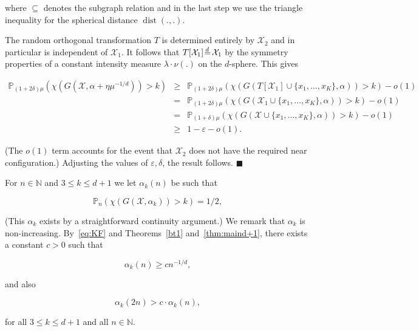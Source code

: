 \documentclass[11pt]{article}%
\newenvironment{proof}{\vspace{1ex}\noindent{\bf Proof.}}{\hspace*{\fill}$\blacksquare$\vspace{1ex}}
\newcommand{\Xcal}[0]{\ensuremath{{\mathcal X}}}
\newcommand{\eN}[0]{\ensuremath{ \mathbb N}}
\newcommand{\Pee}[0]{\ensuremath{{\mathbb P}}}
\newcommand{\isd}[0]{\hspace{.2ex} \raisebox{-.1ex}{$=$} \hspace{-1.5ex} 
\raisebox{1ex}{{$\scriptstyle d$}} \hspace{.8ex} }
\newcommand{\eps}{\varepsilon}
\DeclareMathOperator{\dist}{dist}
\begin{document}
\begin{proof}
\noindent
where $\subseteq$ denotes the subgraph relation and in the last 
step we use the triangle inequality for the spherical distance $\dist(.,.)$.
 
The random orthogonal transformation $T$ is determined entirely by $\Xcal_2$ and 
in particular is independent of $\Xcal_1$.
It follows that $T[\Xcal_1]\isd \Xcal_1$ by the symmetry properties 
of a constant intensity measure $\lambda\cdot \nu(.)$ on the $d$-sphere.
This gives

$$ \begin{array}{rcl} 
\Pee_{(1+2\delta)\mu}\left( \chi\left(G( \Xcal, \alpha+\eta\mu^{-1/d} )\right) > k \right)
& \geq & 
\Pee_{(1+2\delta)\mu}\left( \chi\left(G( T\left[\Xcal_1\right] \cup \{x_1,\dots,x_K\}, \alpha )\right) > k \right)-o(1)\\
& = & \Pee_{(1+2\delta)\mu}\left( \chi\left(G( \Xcal_1 \cup \{x_1,\dots,x_K\}, \alpha )\right) > k \right) -o(1) \\
& = & \Pee_{(1+\delta)\mu}\left( \chi\left(G( \Xcal \cup \{x_1,\dots,x_K\}, \alpha )\right) > k \right) - o(1)\\
& \geq & 1-\eps-o(1). \end{array} $$

\noindent
(The $o(1)$ term accounts for the event that $\Xcal_2$ does not have the required near configuration.)
Adjusting the values of $\eps,\delta$, the result follows.
\end{proof}


For $n\in\eN$ and $3\leq k \leq d+1$ we let $\alpha_k(n)$ be such that

$$ \Pee_n( \chi(G(\Xcal,\alpha_k)) > k ) = 1/2, $$

\noindent
(This $\alpha_k$ exists by a straightforward continuity argument.)
We remark that $\alpha_k$ is non-increasing.
By~\eqref{eq:KF} and Theorems~\ref{bt1} and~\ref{thm:maind+1}, there exists a constant $c > 0$ such that 

\begin{equation}\label{eq:muis} 
\alpha_k(n) \geq c n^{-1/d},  
\end{equation}


\noindent
and also 

\begin{equation}\label{eq:walnoot}
\alpha_k(2n) > c \cdot \alpha_k(n), 
\end{equation}


\noindent 
for all $3\leq k \leq d+1$ and all $n \in \eN$.

\vspace{1ex}
\end{document}
